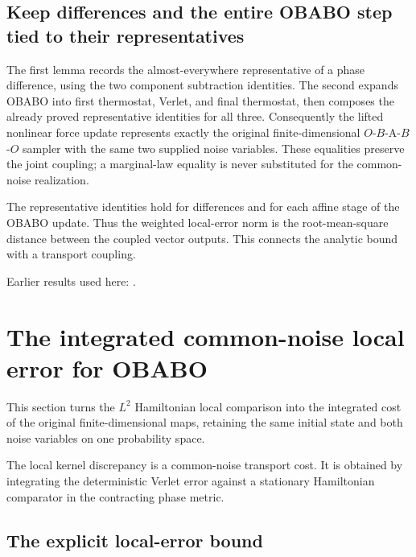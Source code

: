 \documentclass[11pt,a4paper]{report}
\begin{document}
\subsection{\texorpdfstring{Keep differences and the entire OBABO step tied to their representatives}{Keep differences and the entire OBABO step tied to their representatives}}
\label{report-step-KineticLangevin-LpWeightedGeometry-lean-3}


The first lemma records the almost-everywhere representative of a phase difference, using the two component subtraction identities. The second expands OBABO into first thermostat, Verlet, and final thermostat, then composes the already proved representative identities for all three. Consequently the lifted nonlinear force update represents exactly the original finite-dimensional \(O\)-\(B\)-A-\(B\)-\(O\) sampler with the same two supplied noise variables. These equalities preserve the joint coupling; a marginal-law equality is never substituted for the common-noise realization.



The representative identities hold for differences and for each affine stage of the OBABO update. Thus the weighted local-error norm is the root-mean-square distance between the coupled vector outputs. This connects the analytic bound with a transport coupling.



Earlier results used here: \cite[Section~3.13.2]{LangevinLean2026ULASC}.
\section{\texorpdfstring{The integrated common-noise local error for OBABO}{The integrated common-noise local error for OBABO}}
\label{proof-module-KineticLangevin-OBABOLocalCost-lean}


This section turns the \(L^{2}\) Hamiltonian local comparison into the integrated cost of the original finite-dimensional maps, retaining the same initial state and both noise variables on one probability space.



The local kernel discrepancy is a common-noise transport cost. It is obtained by integrating the deterministic Verlet error against a stationary Hamiltonian comparator in the contracting phase metric.

\subsection{\texorpdfstring{The explicit local-error bound}{The explicit local-error bound}}
\label{report-step-KineticLangevin-OBABOLocalCost-lean-1}
\end{document}

